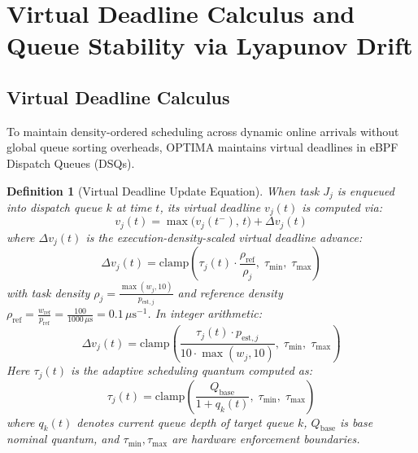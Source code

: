 \documentclass[conference]{IEEEtran}
\newtheorem{definition}{Definition}
\begin{document}
\section{Virtual Deadline Calculus and Queue Stability via Lyapunov Drift}
\label{sec:theorem3}

\subsection{Virtual Deadline Calculus}
To maintain density-ordered scheduling across dynamic online arrivals without global queue sorting overheads, OPTIMA maintains virtual deadlines in eBPF Dispatch Queues (DSQs).

\begin{definition}[Virtual Deadline Update Equation]
\label{def:vdeadline}
When task $J_j$ is enqueued into dispatch queue $k$ at time $t$, its virtual deadline $v_j(t)$ is computed via:
\begin{equation}
\label{eq:vdeadline}
v_j(t) = \max\Big( v_j(t^-), \, t \Big) + \Delta v_j(t)
\end{equation}
where $\Delta v_j(t)$ is the execution-density-scaled virtual deadline advance:
\begin{equation}
\label{eq:delta_v_formula}
\Delta v_j(t) = \mathrm{clamp}\left( \tau_j(t) \cdot \frac{\rho_{\mathrm{ref}}}{\rho_j}, \; \tau_{\min}, \; \tau_{\max} \right)
\end{equation}
with task density $\rho_j = \frac{\max(w_j, 10)}{p_{\mathrm{est},j}}$ and reference density $\rho_{\mathrm{ref}} = \frac{w_{\mathrm{ref}}}{p_{\mathrm{ref}}} = \frac{100}{1000\,\mu\text{s}} = 0.1\,\mu\text{s}^{-1}$. In integer arithmetic:
\begin{equation}
\Delta v_j(t) = \mathrm{clamp}\left( \frac{\tau_j(t) \cdot p_{\mathrm{est},j}}{10 \cdot \max(w_j, 10)}, \; \tau_{\min}, \; \tau_{\max} \right)
\end{equation}
Here $\tau_j(t)$ is the adaptive scheduling quantum computed as:
\begin{equation}
\label{eq:adaptive_slice}
\tau_j(t) = \mathrm{clamp}\left( \frac{Q_{\mathrm{base}}}{1 + q_k(t)}, \; \tau_{\min}, \; \tau_{\max} \right)
\end{equation}
where $q_k(t)$ denotes current queue depth of target queue $k$, $Q_{\mathrm{base}}$ is base nominal quantum, and $\tau_{\min}, \tau_{\max}$ are hardware enforcement boundaries.
\end{definition}
\end{document}
